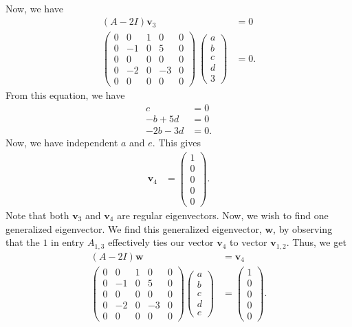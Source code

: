 \documentclass[10pt]{mypackage}
\begin{document}
\begin{example}
\begin{align*}
  \end{align*}
  Now, we have
  \begin{align*}
    \left( A - 2I \right)\mathbf{v}_3 &= 0\\
    \begin{pmatrix}0 & 0 & 1 & 0 & 0 \\ 0 & -1 & 0 & 5 & 0 \\ 0 & 0 & 0 & 0 & 0 \\  0 & -2 & 0 & -3 & 0 \\ 0 & 0 & 0 & 0 & 0 \end{pmatrix} \:\begin{pmatrix}a\\b\\c\\d\\3\end{pmatrix} &= 0.
  \end{align*}
  From this equation, we have
  \begin{align*}
    c &= 0\\
    -b + 5d &= 0\\
    -2b-3d &= 0.
  \end{align*}
  Now, we have independent $a$ and $e$. This gives
  \begin{align*}
    \mathbf{v}_4 &= \begin{pmatrix}1\\0\\0\\0\\0\end{pmatrix}.
  \end{align*}
  Note that both $\mathbf{v}_3$ and $\mathbf{v}_4$ are regular eigenvectors. Now, we wish to find one generalized eigenvector. We find this generalized eigenvector, $\mathbf{w}$, by observing that the $1$ in entry $A_{1,3}$ effectively ties our vector $\mathbf{v}_4$ to vector $\mathbf{v}_{1,2}$. Thus, we get
  \begin{align*}
    \left( A - 2I \right)\mathbf{w} &= \mathbf{v}_4\\
    \begin{pmatrix}0 & 0 & 1 & 0 & 0 \\ 0 & -1 & 0 & 5 & 0 \\ 0 & 0 & 0 & 0 & 0 \\ 0 & -2 & 0 & -3 & 0 \\ 0 & 0 & 0 & 0 & 0\end{pmatrix} \begin{pmatrix}a\\b\\c\\d\\e\end{pmatrix} &= \begin{pmatrix}1\\0\\0\\0\\0\end{pmatrix}.

\end{align*}
\end{example}
\end{document}
